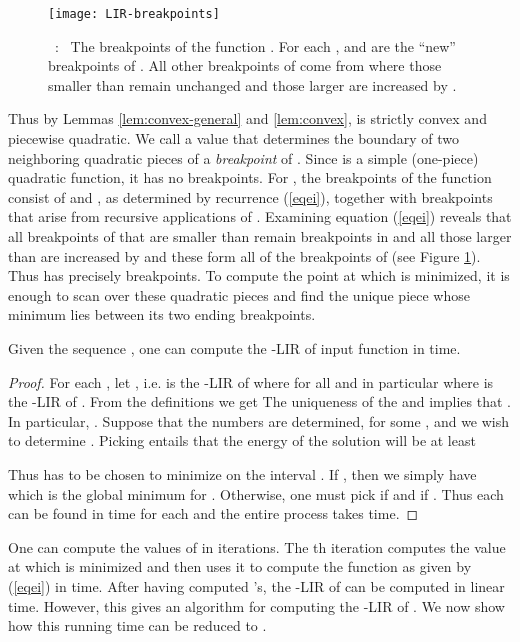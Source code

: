 \documentclass[11pt]{article}
\newcommand\myCaption[1]{\small\refstepcounter{figure}\figurename\ \thefigure :\ #1}
\begin{document}
\begin{figure}
\begin{center}
\texttt{[image: LIR-breakpoints]}
\end{center}
\myCaption{\label{fig:LIR-breakpoints} The breakpoints of the function . For each ,  and  are the ``new'' breakpoints of . All other breakpoints of  come from  where those smaller than  remain unchanged and those larger are increased by .}
\end{figure}

Thus by Lemmas \ref{lem:convex-general} and \ref{lem:convex},  is strictly convex and piecewise quadratic. 
We call a value  that determines the boundary of two neighboring quadratic pieces of  a {\em breakpoint} of . Since  is a simple (one-piece) quadratic function, it has no breakpoints. For , the  breakpoints of the function  consist of  and , as determined by recurrence (\ref{eqei}), together with breakpoints that arise from recursive applications of . 
Examining equation (\ref{eqei}) reveals that all breakpoints of  that are smaller than  remain breakpoints in  and all those larger than  are increased by  and these form all of the breakpoints of  (see Figure \ref{fig:LIR-breakpoints}).  Thus  has precisely  breakpoints. 
To compute the point  at which  is minimized, it is enough to scan over these  quadratic pieces and find the unique piece whose minimum lies between its two ending breakpoints. 


\begin{lemma}\label{lem:backsolve}
Given the sequence , one can compute the -LIR  of input function  in  time. 
\end{lemma}
\begin{proof}For each , let , i.e.  is the -LIR of  where  for all  and in particular  where  is the -LIR of . From the definitions we get 
The uniqueness of the  and  implies that . In particular, . Suppose that the numbers  are determined, for some , and we wish to determine . Picking  entails that the energy of the solution will be at least 

Thus  has to be chosen to minimize  on the interval . If , then we simply have  which is the global minimum for . Otherwise, one must pick  if  and  if . Thus each  can be found in  time for each  and the entire process takes  time.
\end{proof}


One can compute the values of  in  iterations. The th iteration computes the value  at which  is minimized and then uses it to compute the function  as given by (\ref{eqei}) in  time.  After having computed 's, the -LIR of  can be computed in linear time.  
However, this gives an  algorithm for computing the -LIR of . We now show how this running time can be reduced to .
\end{document}
